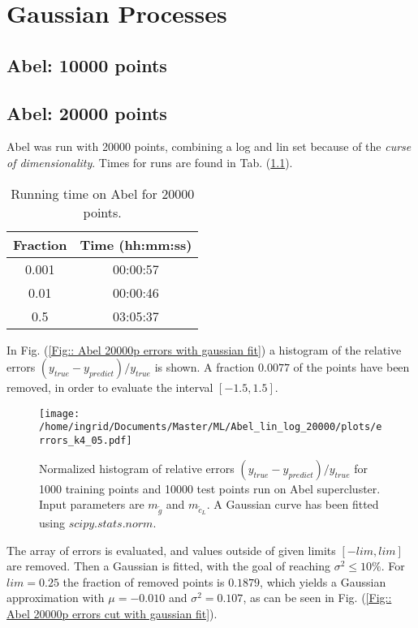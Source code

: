 \documentclass[twoside,english]{uiofysmaster}
\begin{document}
\chapter{Gaussian Processes}

\section{Abel: 10000 points}

\section{Abel: 20000 points}

Abel was run with 20000 points, combining a log and lin set because of the \textit{curse of dimensionality}. Times for runs are found in Tab. (\ref{Tab:: runtime Abel 20000p}).

\begin{table}
\centering
\begin{tabular}{|c|c|}
\hline
Fraction & Time (hh:mm:ss)\\
\hline
0.001 & 00:00:57\\
0.01 & 00:00:46\\
0.5 & 03:05:37\\
\hline
\end{tabular}
\caption{Running time on Abel for 20000 points.}
\label{Tab:: runtime Abel 20000p}
\end{table}

In Fig. (\ref{Fig:: Abel 20000p errors with gaussian fit}) a histogram of the relative errors $(y_{true} - y_{predict})/y_{true}$ is shown. A fraction $0.0077$ of the points have been removed, in order to evaluate the interval $[-1.5,1.5]$.

\begin{figure}[H]
\centering
\texttt{[image: /home/ingrid/Documents/Master/ML/Abel\_lin\_log\_20000/plots/errors\_k4\_05.pdf]}
\caption{Normalized histogram of relative errors $(y_{true} - y_{predict})/y_{true}$ for 1000 training points and 10000 test points run on Abel supercluster. Input parameters are $m_{\tilde{g}}$ and $m_{\tilde{c}_L}$. A Gaussian curve has been fitted using $scipy.stats.norm$.}
\label{Fig:: Abel 20000p 0.5 k4 errors with gaussian fit}
\end{figure}


The array of errors is evaluated, and values outside of given limits $ [-lim, lim ] $ are removed. Then a Gaussian is fitted, with the goal of reaching $\sigma^2 \leq 10 \%$. For $lim=0.25$ the fraction of removed points is $0.1879$, which yields a Gaussian approximation with $\mu = -0.010$ and $\sigma^2 = 0.107$, as can be seen in Fig. (\ref{Fig:: Abel 20000p errors cut with gaussian fit}).
\end{document}

